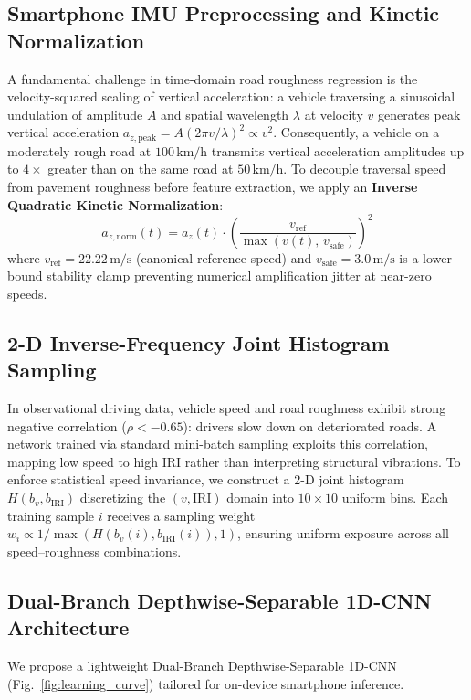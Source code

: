 \documentclass[conference]{IEEEtran}
\begin{document}
\subsection{Smartphone IMU Preprocessing and Kinetic Normalization}
A fundamental challenge in time-domain road roughness regression is the velocity-squared scaling of vertical acceleration: a vehicle traversing a sinusoidal undulation of amplitude $A$ and spatial wavelength $\lambda$ at velocity $v$ generates peak vertical acceleration $a_{z,\text{peak}} = A(2\pi v/\lambda)^2 \propto v^2$. Consequently, a vehicle on a moderately rough road at $100\,\text{km/h}$ transmits vertical acceleration amplitudes up to $4\times$ greater than on the same road at $50\,\text{km/h}$. To decouple traversal speed from pavement roughness before feature extraction, we apply an \textbf{Inverse Quadratic Kinetic Normalization}:
\begin{equation}
a_{z,\text{norm}}(t) = a_z(t) \cdot \left( \frac{v_{\text{ref}}}{\max(v(t),\, v_{\text{safe}})} \right)^2
\end{equation}
where $v_{\text{ref}} = 22.22\,\text{m/s}$ (canonical reference speed) and $v_{\text{safe}} = 3.0\,\text{m/s}$ is a lower-bound stability clamp preventing numerical amplification jitter at near-zero speeds.

\subsection{2-D Inverse-Frequency Joint Histogram Sampling}
In observational driving data, vehicle speed and road roughness exhibit strong negative correlation ($\rho < -0.65$): drivers slow down on deteriorated roads. A network trained via standard mini-batch sampling exploits this correlation, mapping low speed to high IRI rather than interpreting structural vibrations. To enforce statistical speed invariance, we construct a 2-D joint histogram $H(b_v, b_{\text{IRI}})$ discretizing the $(v, \text{IRI})$ domain into $10 \times 10$ uniform bins. Each training sample $i$ receives a sampling weight $w_i \propto 1/\max(H(b_v(i), b_{\text{IRI}}(i)), 1)$, ensuring uniform exposure across all speed--roughness combinations.

\subsection{Dual-Branch Depthwise-Separable 1D-CNN Architecture}
We propose a lightweight Dual-Branch Depthwise-Separable 1D-CNN (Fig.~\ref{fig:learning_curve}) tailored for on-device smartphone inference.
\end{document}
